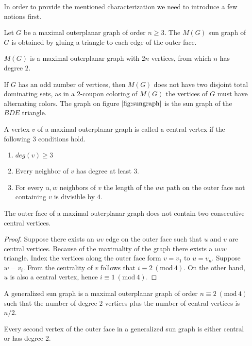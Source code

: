 In order to provide the mentioned characterization we need to introduce a few
notions first.
\begin{definition}
  Let $G$ be a maximal outerplanar graph of order $n \ge 3$. The $M(G)$ sun graph
  of $G$ is obtained by gluing a triangle to each edge of the outer face.
\end{definition}
\begin{remark}
  $M(G)$ is a maximal outerplanar graph with $2n$ vertices, from which $n$ has
  degree $2$.
\end{remark}
\begin{remark}
  If $G$ has an odd number of vertices, then $M(G)$ does not have two disjoint
  total dominating sets, as in a $2$-coupon coloring of $M(G)$ the vertices of
  $G$ must have alternating colors. The graph on figure $\ref{fig:sungraph}$ is
  the sun graph of the $BDE$ triangle.
\end{remark}
\begin{definition}
  A vertex $v$ of a maximal outerplanar graph is called a central vertex if the
  following $3$ conditions hold.
  \begin{enumerate}
    \item $deg(v) \ge 3$
    \item Every neighbor of $v$ has degree at least $3$.
    \item For every $u, w$ neighbors of $v$ the length of the $uw$ path on the
    outer face not containing $v$ is divisible by $4$.
  \end{enumerate}
\end{definition}
\begin{claim}
  The outer face of a maximal outerplanar graph does not contain two consecutive
  central vertices.
\end{claim}
\begin{proof}
  Suppose there exists an $uv$ edge on the outer face such that $u$ and $v$ are
  central vertices. Because of the maximality of the graph there exists a $uvw$
  triangle. Index the vertices along the outer face form $v = v_1$ to $u = v_{n}$.
  Suppose $w = v_i$. From the centrality of $v$ follows that $i \equiv 2\
  (\textrm{mod}\ 4)$. On the other hand, $u$ is also a central vertex, hence
  $i \equiv 1\ (\textrm{mod}\ 4)$.
\end{proof}
\begin{definition}
  A generalized sun graph is a maximal outerplanar graph of order
  $n \equiv 2\ (\textrm{mod}\ 4)$ such that the number of
  degree $2$ vertices plus the number of central vertices is $n/2$.
\end{definition}
\begin{remark}
  Every second vertex of the outer face in a generalized sun graph is either
  central or has degree $2$.
\end{remark}

